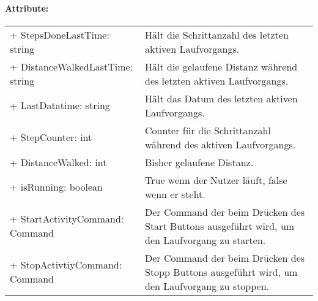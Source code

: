 \documentclass[a4paper,12pt]{article}
\begin{document}
\paragraph{Attribute:}
\begin{tabular}{p{7cm}p{10cm}}
+ StepsDoneLastTime: string & Hält die Schrittanzahl des letzten aktiven Laufvorgangs. \\
+ DistanceWalkedLastTime: string & Hält die gelaufene Distanz während des letzten aktiven Laufvorgangs. \\
+ LastDatatime: string & Hält das Datum des letzten aktiven Laufvorgangs. \\
+ StepCounter: int & Counter für die Schrittanzahl während des aktiven Laufvorgangs. \\
+ DistanceWalked: int & Bisher gelaufene Distanz. \\
+ isRunning: boolean & True wenn der Nutzer läuft, false wenn er steht. \\
+ StartActivityCommand: Command & Der Command der beim Drücken des Start Buttons ausgeführt wird, um den Laufvorgang zu starten. \\
+ StopActivtiyCommand: Command & Der Command der beim Drücken des Stopp Buttons ausgeführt wird, um den Laufvorgang zu stoppen. \\
\end{tabular}
\end{document}
